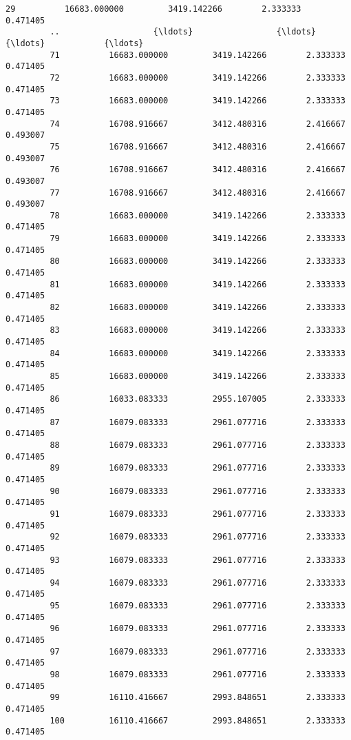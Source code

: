 \documentclass[11pt]{article}
\begin{document}
\begin{Verbatim}[commandchars=\\\{\}]
         29          16683.000000         3419.142266        2.333333       0.471405   
         ..                   {\ldots}                 {\ldots}             {\ldots}            {\ldots}   
         71          16683.000000         3419.142266        2.333333       0.471405   
         72          16683.000000         3419.142266        2.333333       0.471405   
         73          16683.000000         3419.142266        2.333333       0.471405   
         74          16708.916667         3412.480316        2.416667       0.493007   
         75          16708.916667         3412.480316        2.416667       0.493007   
         76          16708.916667         3412.480316        2.416667       0.493007   
         77          16708.916667         3412.480316        2.416667       0.493007   
         78          16683.000000         3419.142266        2.333333       0.471405   
         79          16683.000000         3419.142266        2.333333       0.471405   
         80          16683.000000         3419.142266        2.333333       0.471405   
         81          16683.000000         3419.142266        2.333333       0.471405   
         82          16683.000000         3419.142266        2.333333       0.471405   
         83          16683.000000         3419.142266        2.333333       0.471405   
         84          16683.000000         3419.142266        2.333333       0.471405   
         85          16683.000000         3419.142266        2.333333       0.471405   
         86          16033.083333         2955.107005        2.333333       0.471405   
         87          16079.083333         2961.077716        2.333333       0.471405   
         88          16079.083333         2961.077716        2.333333       0.471405   
         89          16079.083333         2961.077716        2.333333       0.471405   
         90          16079.083333         2961.077716        2.333333       0.471405   
         91          16079.083333         2961.077716        2.333333       0.471405   
         92          16079.083333         2961.077716        2.333333       0.471405   
         93          16079.083333         2961.077716        2.333333       0.471405   
         94          16079.083333         2961.077716        2.333333       0.471405   
         95          16079.083333         2961.077716        2.333333       0.471405   
         96          16079.083333         2961.077716        2.333333       0.471405   
         97          16079.083333         2961.077716        2.333333       0.471405   
         98          16079.083333         2961.077716        2.333333       0.471405   
         99          16110.416667         2993.848651        2.333333       0.471405   
         100         16110.416667         2993.848651        2.333333       0.471405   
         

\end{Verbatim}
\end{document}
